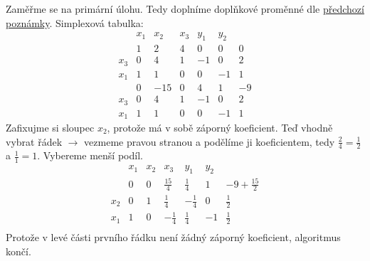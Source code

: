 Zaměřme se na primární úlohu.
Tedy doplníme doplňkové proměnné dle \hyperref[simplDual]{předchozí poznámky}.
Simplexová tabulka:
\[
    \begin{array}{c|rrrrr|r}
           &x_1 & x_2 & x_3 & y_1 & y_2 &  \\
           & 1 & 2 & 4 & 0 & 0 & 0 \\ \hline
        x_3& 0 & 4 & 1 &-1 & 0 & 2 \\
        x_1& 1 & 1 & 0 & 0 &-1 & 1 \\
           & 0 &-15& 0 & 4 & 1 & -9\\ \hline
        x_3& 0 & 4 & 1 &-1 & 0 & 2 \\
        x_1& 1 & 1 & 0 & 0 &-1 & 1
    \end{array}
\]
Zafixujme si sloupec $x_2$, protože má v sobě záporný koeficient. Teď vhodně vybrat řádek $\rightarrow$ vezmeme pravou 
stranou a podělíme ji koeficientem, tedy $\frac{2}{4}=\frac{1}{2}$ a $\frac{1}{1}=1$. Vybereme menší podíl.
\[
    \begin{array}{c|rrrrr|r}
           &x_1 & x_2 & x_3 & y_1 & y_2 &  \\
           & 0 & 0 & \frac{15}{4} & \frac{1}{4} & 1 & -9 + \frac{15}{2}\\ \hline
        x_2& 0 & 1 & \frac{1}{4} &-\frac{1}{4} & 0 & \frac{1}{2} \\
        x_1& 1 & 0 & -\frac{1}{4} & \frac{1}{4} &-1 & \frac{1}{2} \\
    \end{array}
\]
Protože v levé části prvního řádku není žádný záporný koeficient, algoritmus končí.

